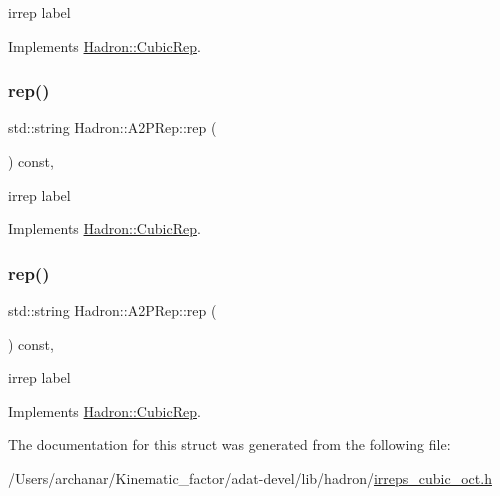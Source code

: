 irrep label 

Implements \mbox{\hyperlink{structHadron_1_1CubicRep_ac3eb63608803d44c68681f158e14eb1b}{Hadron\+::\+Cubic\+Rep}}.

\mbox{\label{structHadron_1_1A2PRep_aa2ba2d1bc832b1d1fdba1befcfe8a256}} 
\subsubsection{\texorpdfstring{rep()}{rep()}\hspace{0.1cm}{\footnotesize\ttfamily [2/3]}}
{\footnotesize\ttfamily std\+::string Hadron\+::\+A2\+P\+Rep\+::rep (\begin{DoxyParamCaption}{ }\end{DoxyParamCaption}) const\hspace{0.3cm}{\ttfamily [inline]}, {\ttfamily [virtual]}}

irrep label 

Implements \mbox{\hyperlink{structHadron_1_1CubicRep_ac3eb63608803d44c68681f158e14eb1b}{Hadron\+::\+Cubic\+Rep}}.

\mbox{\label{structHadron_1_1A2PRep_aa2ba2d1bc832b1d1fdba1befcfe8a256}} 
\subsubsection{\texorpdfstring{rep()}{rep()}\hspace{0.1cm}{\footnotesize\ttfamily [3/3]}}
{\footnotesize\ttfamily std\+::string Hadron\+::\+A2\+P\+Rep\+::rep (\begin{DoxyParamCaption}{ }\end{DoxyParamCaption}) const\hspace{0.3cm}{\ttfamily [inline]}, {\ttfamily [virtual]}}

irrep label 

Implements \mbox{\hyperlink{structHadron_1_1CubicRep_ac3eb63608803d44c68681f158e14eb1b}{Hadron\+::\+Cubic\+Rep}}.



The documentation for this struct was generated from the following file\+:\begin{DoxyCompactItemize}
\item 
/\+Users/archanar/\+Kinematic\+\_\+factor/adat-\/devel/lib/hadron/\mbox{\hyperlink{adat-devel_2lib_2hadron_2irreps__cubic__oct_8h}{irreps\+\_\+cubic\+\_\+oct.\+h}}\end{DoxyCompactItemize}
